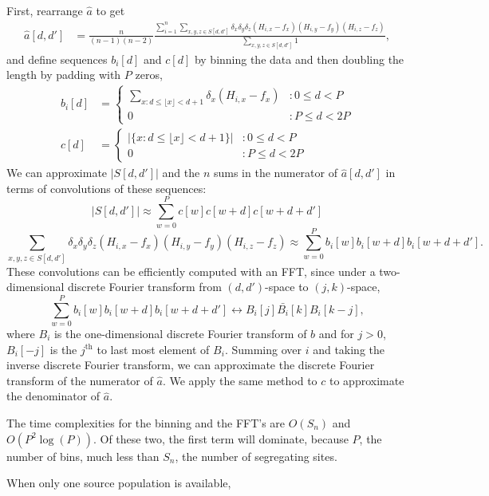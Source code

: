 \documentclass[10pt]{article}
\begin{document}
First, rearrange $\hat{a}$ to get
\begin{align*}
	\hat{a}[d,d'] &=
	\frac{n}{(n-1)(n-2)}
	\frac{
		\sum_{i=1}^n \sum_{x,y,z\in S[d,d']}
		\delta_x \delta_y \delta_z (H_{i,x} - f_x) (H_{i,y} - f_y) (H_{i,z} - f_z)
	}{
		\sum_{x,y,z \in S[d,d']}
		1
	},
\end{align*}
and define sequences $b_i[d]$ and $c[d]$ by binning the data and then doubling
the length by padding with $P$ zeros,
\begin{align*}
	b_i[d] &=
	\left\{
		\begin{array}{ll}
			\sum_{x: d\leq \lfloor{x}\rfloor < d+1} \delta_x(H_{i,x}-f_x) & : 0 \leq d < P\\
			0 & : P\leq d <2P
		\end{array}
	\right.\\
	c[d] &=
	\left\{
		\begin{array}{ll}
			|\{x: d\leq \lfloor{x}\rfloor < d+1\}| & : 0\leq d < P\\
			0 & : P\leq d <2P
		\end{array}
	\right.
\end{align*}
We can approximate $|S[d,d']|$ and the $n$ sums in the numerator of
$\hat{a}[d,d']$ in terms of convolutions of these sequences:
$$
	|S[d,d']| \approx \sum_{w=0}^P c[w]c[w+d]c[w+d+d']
$$
$$
	\sum_{x,y,z\in S[d,d']}
	\delta_x\delta_y\delta_z(H_{i,x}-f_x)(H_{i,y}-f_y)(H_{i,z}-f_z)
	\approx
	\sum_{w=0}^P b_i[w]b_i[w+d]b_i[w+d+d'].
$$
These convolutions can be efficiently
computed with an FFT, since under a two-dimensional discrete Fourier transform
from $(d, d')$-space to $(j, k)$-space,
$$
\sum_{w=0}^P b_i[w]b_i[w+d]b_i[w+d+d']
\leftrightarrow
B_i[j]\bar{B_i}[k]B_i[k-j],
$$
where $B_i$ is the one-dimensional discrete Fourier transform of $b$ and for
$j>0$, $B_i[-j]$ is the $j^\text{th}$ to last most element of $B_i$.
Summing over $i$ and taking the inverse discrete Fourier transform, we can
approximate the discrete Fourier transform of the numerator of $\hat{a}$. We
apply the same method to $c$ to approximate the denominator of $\hat{a}$.

The time complexities for the binning and the FFT's are $O(S_n)$ and
$O(P^2\log(P))$. Of these two, the first term will dominate, because $P$, the
number of bins, much less than $S_n$, the number of segregating sites.

When only one source population is available,
\end{document}
